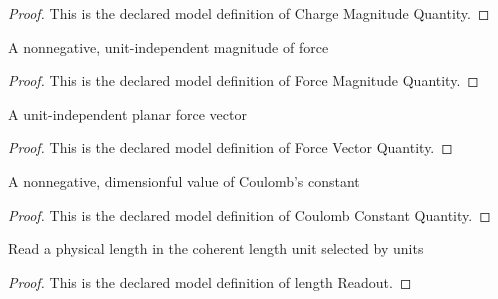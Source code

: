\begin{proof}
  This is the declared model definition of Charge Magnitude Quantity.
\end{proof}
\begin{definition}
  \label{def:physics:phyx-mini-0893:phyxminiproblems-problemphyxmini0893-forcemagnitudequantity}
  A nonnegative, unit-independent magnitude of force
\end{definition}
\begin{proof}
  This is the declared model definition of Force Magnitude Quantity.
\end{proof}
\begin{definition}
  \label{def:physics:phyx-mini-0893:phyxminiproblems-problemphyxmini0893-forcevectorquantity}
  A unit-independent planar force vector
\end{definition}
\begin{proof}
  This is the declared model definition of Force Vector Quantity.
\end{proof}
\begin{definition}
  \label{def:physics:phyx-mini-0893:phyxminiproblems-problemphyxmini0893-coulombconstantquantity}
  A nonnegative, dimensionful value of Coulomb's constant
\end{definition}
\begin{proof}
  This is the declared model definition of Coulomb Constant Quantity.
\end{proof}
\begin{definition}
  \label{def:physics:phyx-mini-0893:phyxminiproblems-problemphyxmini0893-lengthreadout}
  Read a physical length in the coherent length unit selected by units
\end{definition}
\begin{proof}
  This is the declared model definition of length Readout.
\end{proof}
